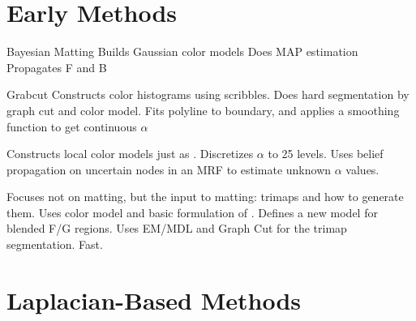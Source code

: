 \documentclass{beamer}
\begin{document}
\section{Early Methods}%

\begin{frame}[allowframebreaks]{Bayesian Matting \cite{chuang2001bayesian}}
 Builds Gaussian color models
 Does MAP estimation
 Propagates F and B
\end{frame}

\begin{frame}[allowframebreaks]{Grabcut \cite{rother2004grabcut}}
 Constructs color histograms using scribbles.
 Does hard segmentation by graph cut and color model.
 Fits polyline to boundary, and applies a smoothing function to get continuous $\alpha$
\end{frame}

\begin{frame}[allowframebreaks]{\cite{wang2005iterative}}
 Constructs local color models just as \cite{chuang2001bayesian}.
 Discretizes $\alpha$ to 25 levels.
 Uses belief propagation on uncertain nodes in an MRF to estimate unknown $\alpha$ values.
\end{frame}

\begin{frame}[allowframebreaks]{\cite{juan2005trimap}}
 Focuses not on matting, but the input to matting: trimaps and how to generate them.
 Uses color model and basic formulation of \cite{rother2004grabcut}.
 Defines a new model for blended F/G regions.
 Uses EM/MDL and Graph Cut for the trimap segmentation.
 Fast.
\end{frame}

\section{Laplacian-Based Methods}%
\end{document}
